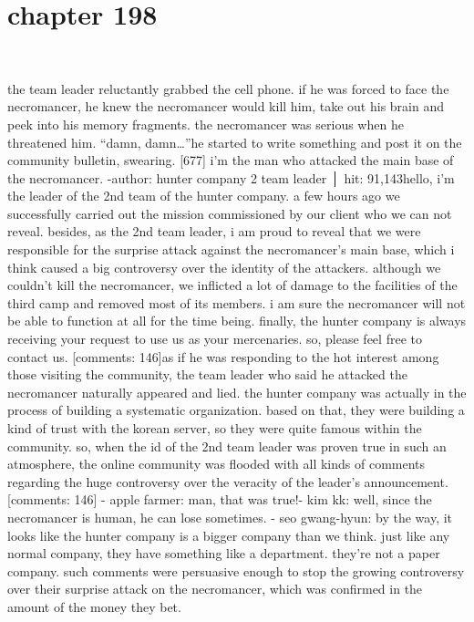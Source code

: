\section{chapter 198}

                             




the team leader reluctantly grabbed the cell phone.
 if he was forced to face the necromancer, he knew the necromancer would kill him, take out his brain and peek into his memory fragments.
 the necromancer was serious when he threatened him.
“damn, damn…”he started to write something and post it on the community bulletin, swearing.
[677] i’m the man who attacked the main base of the necromancer.
-author: hunter company 2 team leader │ hit: 91,143hello, i’m the leader of the 2nd team of the hunter company.
 a few hours ago we successfully carried out the mission commissioned by our client who we can not reveal.
besides, as the 2nd team leader, i am proud to reveal that we were responsible for the surprise attack against the necromancer’s main base, which i think caused a big controversy over the identity of the attackers.
although we couldn’t kill the necromancer, we inflicted a lot of damage to the facilities of the third camp and removed most of its members.
 i am sure the necromancer will not be able to function at all for the time being.
finally, the hunter company is always receiving your request to use us as your mercenaries.
 so, please feel free to contact us.
[comments: 146]as if he was responding to the hot interest among those visiting the community, the team leader who said he attacked the necromancer naturally appeared and lied.
the hunter company was actually in the process of building a systematic organization.
 based on that, they were building a kind of trust with the korean server, so they were quite famous within the community.
so, when the id of the 2nd team leader was proven true in such an atmosphere, the online community was flooded with all kinds of comments regarding the huge controversy over the veracity of the leader’s announcement.
[comments: 146]
- apple farmer: man, that was true!- kim kk: well, since the necromancer is human, he can lose sometimes.
- seo gwang-hyun: by the way, it looks like the hunter company is a bigger company than we think.
 just like any normal company, they have something like a department.
 they’re not a paper company.
such comments were persuasive enough to stop the growing controversy over their surprise attack on the necromancer, which was confirmed in the amount of the money they bet.

